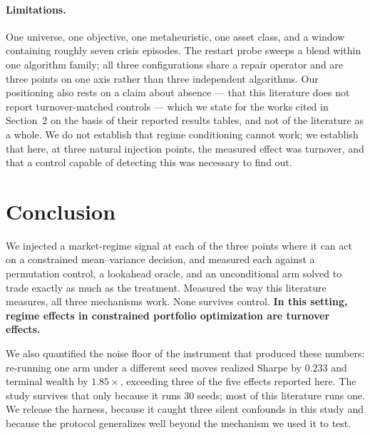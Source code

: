 \documentclass[sigconf,anonymous,review]{acmart}
\begin{document}
\paragraph{Limitations.} One universe, one objective, one metaheuristic, one asset
class, and a window containing roughly seven crisis episodes. The restart probe
sweeps a blend within one algorithm family; all three configurations share a repair
operator and are three points on one axis rather than three independent algorithms.
Our positioning also rests on a claim about absence --- that this literature does
not report turnover-matched controls --- which we state for the works cited in
Section~2 on the basis of their reported results tables, and not of the literature
as a whole. We do not establish that regime conditioning cannot work; we establish
that here, at three natural injection points, the measured effect was turnover, and
that a control capable of detecting this was necessary to find out.

\section{Conclusion}

We injected a market-regime signal at each of the three points where it can act on
a constrained mean--variance decision, and measured each against a permutation
control, a lookahead oracle, and an unconditional arm solved to trade exactly as
much as the treatment. Measured the way this literature measures, all three
mechanisms work. None survives control. \textbf{In this setting, regime effects in
constrained portfolio optimization are turnover effects.}

We also quantified the noise floor of the instrument that produced these numbers:
re-running one arm under a different seed moves realized Sharpe by $0.233$ and
terminal wealth by $1.85\times$, exceeding three of the five effects reported here.
The study survives that only because it runs 30 seeds; most of this literature runs
one. We release the harness, because it caught three silent confounds in this study
and because the protocol generalizes well beyond the mechanism we used it to test.



\end{document}
